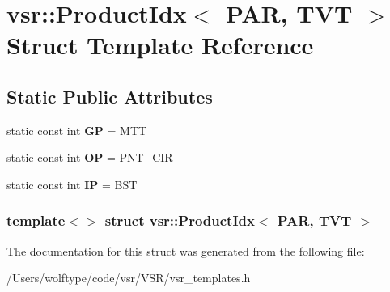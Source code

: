 \hypertarget{structvsr_1_1_product_idx_3_01_p_a_r_00_01_t_v_t_01_4}{\section{vsr\-:\-:Product\-Idx$<$ P\-A\-R, T\-V\-T $>$ Struct Template Reference}
\label{structvsr_1_1_product_idx_3_01_p_a_r_00_01_t_v_t_01_4}
}
\subsection*{Static Public Attributes}
\begin{DoxyCompactItemize}
\item 
\hypertarget{structvsr_1_1_product_idx_3_01_p_a_r_00_01_t_v_t_01_4_a1e0c06e34bc07916e7718f465a905482}{static const int {\bfseries G\-P} = M\-T\-T}\label{structvsr_1_1_product_idx_3_01_p_a_r_00_01_t_v_t_01_4_a1e0c06e34bc07916e7718f465a905482}

\item 
\hypertarget{structvsr_1_1_product_idx_3_01_p_a_r_00_01_t_v_t_01_4_a08ac6343366460646346539ef3690438}{static const int {\bfseries O\-P} = P\-N\-T\-\_\-\-C\-I\-R}\label{structvsr_1_1_product_idx_3_01_p_a_r_00_01_t_v_t_01_4_a08ac6343366460646346539ef3690438}

\item 
\hypertarget{structvsr_1_1_product_idx_3_01_p_a_r_00_01_t_v_t_01_4_a4fd0e6ac8a1265b07099dd5017d7e15f}{static const int {\bfseries I\-P} = B\-S\-T}\label{structvsr_1_1_product_idx_3_01_p_a_r_00_01_t_v_t_01_4_a4fd0e6ac8a1265b07099dd5017d7e15f}

\end{DoxyCompactItemize}
\subsubsection*{template$<$$>$ struct vsr\-::\-Product\-Idx$<$ P\-A\-R, T\-V\-T $>$}



The documentation for this struct was generated from the following file\-:\begin{DoxyCompactItemize}
\item 
/\-Users/wolftype/code/vsr/\-V\-S\-R/vsr\-\_\-templates.\-h\end{DoxyCompactItemize}
